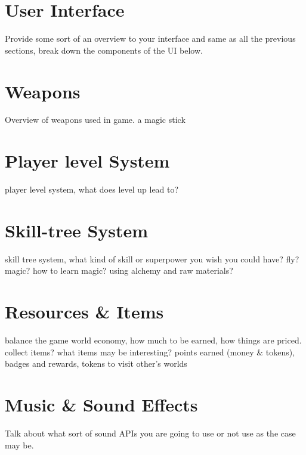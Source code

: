 \documentclass[11pt]{article}
\begin{document}
  \section{User Interface}
    Provide some sort of an overview to your interface and same as all the previous sections, break down the components of the UI below.

  \section{Weapons}
    Overview of weapons used in game. a magic stick

  \section{Player level System}
    player level system, what does level up lead to?

  \section{Skill-tree System}
    skill tree system, what kind of skill or superpower you wish you could have? fly? magic? how to learn magic? using alchemy and raw materials?

  \section{Resources \& Items}
    balance the game world economy, how much to be earned, how things are priced.
    collect items? what items may be interesting?
    points earned (money \& tokens), badges and rewards, tokens to visit other's worlds

  \section{Music \& Sound Effects}
    Talk about what sort of sound APIs you are going to use or not use as the case may be.

\end{document}
